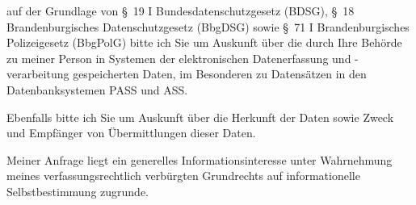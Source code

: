 auf der Grundlage von §~19 I Bundesdatenschutzgesetz (BDSG),
§~18 Brandenburgisches Datenschutzgesetz (BbgDSG) sowie
§~71 I Brandenburgisches Polizeigesetz (BbgPolG) bitte ich Sie um Auskunft über
die durch Ihre Behörde zu meiner Person in Systemen der elektronischen
Datenerfassung und -verarbeitung gespeicherten Daten, im Besonderen zu Datensätzen
in den Datenbanksystemen PASS und ASS.

Ebenfalls bitte ich Sie um Auskunft über die Herkunft der Daten sowie Zweck und
Empfänger von Übermittlungen dieser Daten.

Meiner Anfrage liegt ein generelles Informationsinteresse unter Wahrnehmung
meines verfassungsrechtlich verbürgten Grundrechts auf informationelle
Selbstbestimmung zugrunde.
